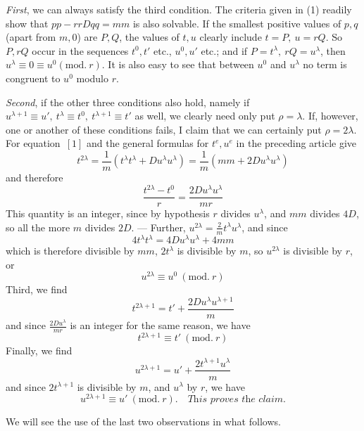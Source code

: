 \textit{First}, we can always satisfy the third condition. The criteria given in (1) readily show that \(pp-rrDqq=mm\) is also solvable. If the smallest positive values of \(p,q\) (apart from \(m,0\)) are \(P,Q\), the values of \(t,u\) clearly include \(t=P,\ u=rQ\). So \(P,rQ\) occur in the sequences \(t^0,t'\) etc., \(u^0,u'\) etc.; and if \(P=t^\lambda,\ rQ=u^\lambda\), then \(u^\lambda\equiv0\equiv u^0(\mathrm{mod.}\ r)\). It is also easy to see that between \(u^0\) and \(u^\lambda\) no term is congruent to \(u^0\) modulo \(r\).

\textit{Second}, if the other three conditions also hold, namely if \(u^{\lambda+1}\equiv u',\ t^\lambda\equiv t^0,\ t^{\lambda+1}\equiv t'\) as well, we clearly need only put \(\rho=\lambda\). If,
however, one or another of these conditions fails, I claim that we can certainly put \(\rho=2\lambda\). For equation~\([1]\) and the general formulas for \(t^e,u^e\) in the preceding article give
\[
t^{2\lambda}=\frac1m(t^\lambda t^\lambda+Du^\lambda u^\lambda)=\frac1m(mm+2Du^\lambda u^\lambda)
\]
and therefore
\[
\frac{t^{2\lambda}-t^0}{r}=\frac{2Du^\lambda u^\lambda}{mr}
\]
This quantity is an integer, since by hypothesis \(r\) divides \(u^\lambda\), and \(mm\) divides \(4D\), so all the more \(m\) divides \(2D\). --- Further, \(u^{2\lambda}=\frac2m t^\lambda u^\lambda\), and since
\[
4t^\lambda t^\lambda=4Du^\lambda u^\lambda+4mm
\]
which is therefore divisible by \(mm\), \(2t^\lambda\) is divisible by \(m\), so \(u^{2\lambda}\) is divisible by \(r\), or
\[
u^{2\lambda}\equiv u^0\ (\mathrm{mod.}\ r)
\]
Third, we find
\[
t^{2\lambda+1}=t'+\frac{2Du^\lambda u^{\lambda+1}}{m}
\]
and since \(\frac{2Du^\lambda}{mr}\) is an integer for the same reason, we have
\[
t^{2\lambda+1}\equiv t'\ (\mathrm{mod.}\ r)
\]
Finally, we find
\[
u^{2\lambda+1}=u'+\frac{2t^{\lambda+1}u^\lambda}{m}
\]
and since \(2t^{\lambda+1}\) is divisible by \(m\), and \(u^\lambda\) by \(r\), we have
\[
u^{2\lambda+1}\equiv u'\ (\mathrm{mod.}\ r).\quad \textit{This proves the claim.}
\]

We will see the use of the last two observations in what follows.

